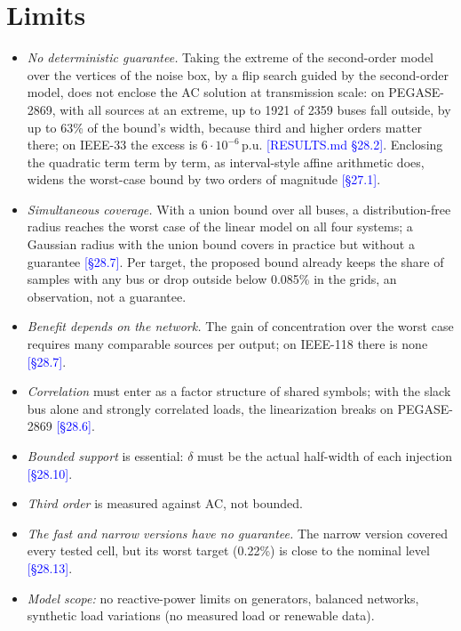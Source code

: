 \documentclass[preprint,12pt]{elsarticle}
\newcommand{\src}[1]{\textcolor{blue}{[#1]}}          %
\begin{document}
\section{Limits}\label{sec:limits}
\begin{itemize}
\item \emph{No deterministic guarantee.} Taking the extreme of the second-order model over the vertices of the
noise box, by a flip search guided by the second-order model, does not enclose the AC solution at transmission scale:
on PEGASE-2869, with all sources at an extreme, up to 1921 of 2359 buses fall outside, by up to 63\% of the bound's
width, because third and higher orders matter there; on IEEE-33 the excess is $6\cdot10^{-6}$\,p.u.
\src{RESULTS.md §28.2}. Enclosing the quadratic term term by term, as interval-style affine arithmetic does, widens the
worst-case bound by two orders of magnitude \src{§27.1}.
\item \emph{Simultaneous coverage.} With a union bound over all buses, a distribution-free radius reaches the worst
case of the linear model on all four systems; a Gaussian radius with the union bound covers in practice but without
a guarantee \src{§28.7}. Per target, the proposed bound already keeps the share of samples with any bus or drop
outside below 0.085\% in the grids, an observation, not a guarantee.
\item \emph{Benefit depends on the network.} The gain of concentration over the worst case requires many comparable
sources per output; on IEEE-118 there is none \src{§28.7}.
\item \emph{Correlation} must enter as a factor structure of shared symbols; with the slack bus alone and strongly
correlated loads, the linearization breaks on PEGASE-2869 \src{§28.6}.
\item \emph{Bounded support} is essential: $\delta$ must be the actual half-width of each injection \src{§28.10}.
\item \emph{Third order} is measured against AC, not bounded.
\item \emph{The fast and narrow versions have no guarantee.} The narrow version covered every tested cell, but its
worst target (0.22\%) is close to the nominal level \src{§28.13}.
\item \emph{Model scope:} no reactive-power limits on generators, balanced networks, synthetic load variations
(no measured load or renewable data).
\end{itemize}
\end{document}
